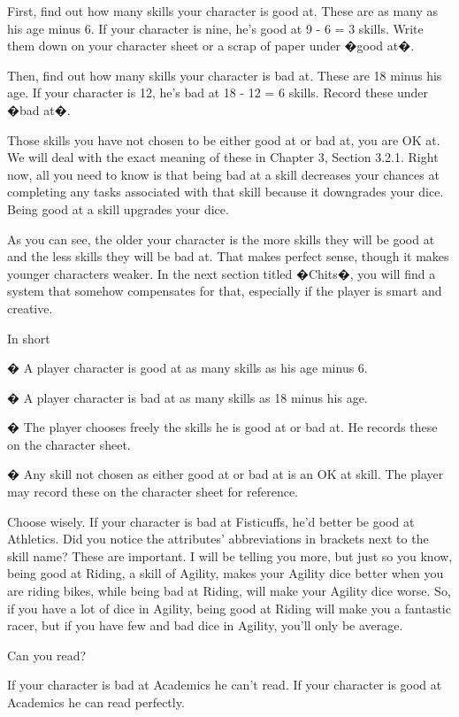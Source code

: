 First, find out how many skills your character is good at. These are as many as his age minus 6. If your character is nine, he's good at 9 - 6 = 3 skills. Write them down on your character sheet or a scrap of paper under �good at�.


Then, find out how many skills your character is bad at. These are 18 minus his age. If your character is 12, he's bad at 18 - 12 = 6 skills. Record these under �bad at�.


Those skills you have not chosen to be either good at or bad at, you are OK at. We will deal with the exact meaning of these in Chapter 3, Section 3.2.1. Right now, all you need to know is that being bad at a skill decreases your chances at completing any tasks associated with that skill because it downgrades your dice. Being good at a skill upgrades your dice.


As you can see, the older your character is the more skills they will be good at and the less skills they will be bad at. That makes perfect sense, though it makes younger characters weaker. In the next section titled �Chits�, you will find a system that somehow compensates for that, especially if the player is smart and creative.


In short


� A player character is good at as many skills as his age minus 6. 


� A player character is bad at as many skills as 18 minus his age.


� The player chooses freely the skills he is good at or bad at. He records these on the character sheet.


� Any skill not chosen as either good at or bad at is an OK at skill. The player may record these on the character sheet for reference.


Choose wisely. If your character is bad at Fisticuffs, he'd better be good at Athletics. Did you notice the attributes' abbreviations in brackets next to the skill name? These are important. I will be telling you more, but just so you know, being good at Riding, a skill of Agility, makes your Agility dice better when you are riding bikes, while being bad at Riding, will make your Agility dice worse. So, if you have a lot of dice in Agility, being good at Riding will make you a fantastic racer, but if you have few and bad dice in Agility, you'll only be average.


Can you read?


If your character is bad at Academics he can't read. If your character is good at Academics he can read perfectly.


